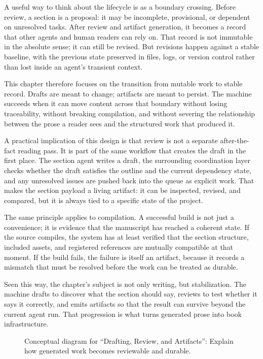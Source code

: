 A useful way to think about the lifecycle is as a boundary crossing. Before review, a section is a proposal: it may be incomplete, provisional, or dependent on unresolved tasks. After review and artifact generation, it becomes a record that other agents and human readers can rely on. That record is not immutable in the absolute sense; it can still be revised. But revisions happen against a stable baseline, with the previous state preserved in files, logs, or version control rather than lost inside an agent's transient context.

This chapter therefore focuses on the transition from mutable work to stable record. Drafts are meant to change; artifacts are meant to persist. The machine succeeds when it can move content across that boundary without losing traceability, without breaking compilation, and without severing the relationship between the prose a reader sees and the structured work that produced it.

A practical implication of this design is that review is not a separate after-the-fact reading pass. It is part of the same workflow that creates the draft in the first place. The section agent writes a draft, the surrounding coordination layer checks whether the draft satisfies the outline and the current dependency state, and any unresolved issues are pushed back into the queue as explicit work. That makes the section payload a living artifact: it can be inspected, revised, and compared, but it is always tied to a specific state of the project.

The same principle applies to compilation. A successful build is not just a convenience; it is evidence that the manuscript has reached a coherent state. If the source compiles, the system has at least verified that the section structure, included assets, and registered references are mutually compatible at that moment. If the build fails, the failure is itself an artifact, because it records a mismatch that must be resolved before the work can be treated as durable.

Seen this way, the chapter's subject is not only writing, but stabilization. The machine drafts to discover what the section should say, reviews to test whether it says it correctly, and emits artifacts so that the result can survive beyond the current agent run. That progression is what turns generated prose into book infrastructure.

\begin{figure}[htbp]
\centering

\caption{Conceptual diagram for ``Drafting, Review, and Artifacts'': Explain how generated work becomes reviewable and durable.}
\end{figure}
